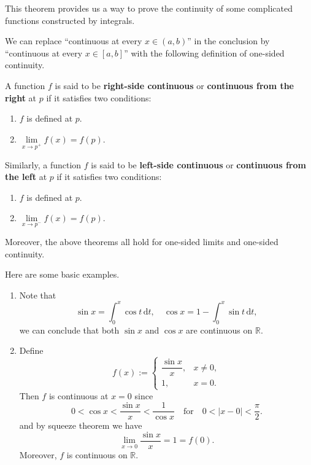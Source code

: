 	\begin{remarkenv}
		This theorem provides us a way to prove the continuity of some complicated functions constructed by integrals.

		We can replace ``continuous at every $x\in(a,b)$'' in the conclusion by ``continuous at every $x\in[a,b]$'' with the following definition of one-sided continuity.
	\end{remarkenv}
	\begin{definitionenv}
		A function $f$ is said to be \textbf{right-side continuous} or \textbf{continuous from the right} at $p$ if it satisfies two conditions:
		\begin{enumerate}
			\item $f$ is defined at $p$.
			\item $\lim\limits_{x\to p^+}f(x)=f(p).$
		\end{enumerate}
		
		Similarly, a function $f$ is said to be \textbf{left-side continuous} or \textbf{continuous from the left} at $p$ if it satisfies two conditions:
		\begin{enumerate}
			\item $f$ is defined at $p$.
			\item $\lim\limits_{x\to p^-}f(x)=f(p).$
		\end{enumerate}
	\end{definitionenv}
	\begin{remarkenv}
		Moreover, the above theorems all hold for one-sided limits and one-sided continuity.
	\end{remarkenv}
	\begin{exampleenv}
		Here are some basic examples.
		\begin{enumerate}
			\item Note that
			\[
			\sin x = \int_0^x \cos t\,\mathrm{d}t,\quad
			\cos x = 1 - \int_0^x \sin t\,\mathrm{d}t,
			\]
			we can conclude that both $\sin x$ and $\cos x$ are continuous on $\mathbb{R}$.
			\item Define
			\[
			f(x):=
			\begin{cases}
				\dfrac{\sin x}{x}, & x \neq 0,\\[6pt]
				1,  & x = 0.
			\end{cases}
			\]
			Then $f$ is continuous at $x=0$ since
			\[
			0<\cos x<\frac{\sin x}{x}<\frac{1}{\cos x}\quad \text{for}\quad 0<|x-0|<\frac{\pi}{2}.
			\]
			and by squeeze theorem we have
			\[
			\lim_{x\to 0} \frac{\sin x}{x}=1=f(0).
			\]
			Moreover, $f$ is continuous on $\mathbb{R}$.
		\end{enumerate}
	\end{exampleenv}
